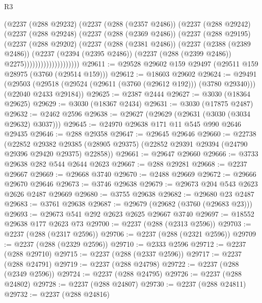 \begin{lexlean}{R3}
\begin{coremodule}
                      (@2237
                        (@288 @29232)
                        (@2237
                          (@288 (@2357 @2486))
                          (@2237
                            (@288 @29242)
                            (@2237
                              (@288 @29248)
                              (@2237
                                (@288 (@2369 @2486))
                                (@2237
                                  (@288 @29195)
                                  (@2237
                                    (@288 @29202)
                                    (@2237
                                      (@288 (@2381 @2486))
                                      (@2237
                                        (@2388 (@2389 @2486))
                                        (@2237
                                          (@2394 (@2395 @2486))
                                          (@2237 (@288 (@2399 @2486)) @2275))))))))))))))))))))
@29611 := @29528 @29602 @159 @29497 (@29511 @159 @28975 (@3760 (@29514 @159)))
@29612 := @18603 @29602
@29624 := @29491
    (@29503 (@29518 (@29524 (@29611 (@3760 (@29612 @192))) (@3780 @29340))) (@22040 @2433 @29184))
@29625 := @2387 @2444
@29627 := @3030 (@18364 @29625)
@29629 := @3030 (@18367 @2434)
@29631 := @3030 (@17875 @2487)
@29632 := @2462 @2596
@29638 := @29627 (@29629 (@29631 (@3030 (@3034 @29632) @3037)))
@29645 := @24970 @29638 @171 @11 @545 @990 @2646 @29435
@29646 := @288 @29358
@29647 := @29645 @29646
@29660 := @22738
    (@22852
      @29382
      @29385
      (@28905 @29375)
      (@22852 @29391 @29394 (@24790 @29396 @29420 @29375) @22858))
@29661 := @29647 @29660
@29666 := @3733 @29638 @282 @544 @2644 @2623
@29667 := @288 @29281
@29668 := @2237 @29667
@29669 := @29668 @3740
@29670 := @2488 @29669
@29672 := @29666 @29670 @29646
@29673 := @3746 @29638
@29679 := @29673 @204 @543 @2623 @2626 @2487 @29669
@29680 := @3755 @29638
@29682 := @29680 @23 @2487
@29683 := @3761 @29638
@29687 := @29679 (@29682 (@3760 (@29683 @23)))
@29693 := @29673 @541 @292 @2623 @2625 @29667 @3740
@29697 := @18552 @29638 @177 @2623 @73
@29700 := @2237 (@288 (@2313 @2596))
@29703 := @2237 (@288 (@2317 @2596))
@29706 := @2237 (@288 (@2321 @2596))
@29709 := @2237 (@288 (@2329 @2596))
@29710 := @2333 @2596
@29712 := @2237 (@288 @29710)
@29715 := @2237 (@288 (@2337 @2596))
@29717 := @2237 (@288 @24791)
@29719 := @2237 (@288 @24798)
@29722 := @2237 (@288 (@2349 @2596))
@29724 := @2237 (@288 @24795)
@29726 := @2237 (@288 @24802)
@29728 := @2237 (@288 @24807)
@29730 := @2237 (@288 @24811)
@29732 := @2237 (@288 @24816)

\end{coremodule}
\end{lexlean}
